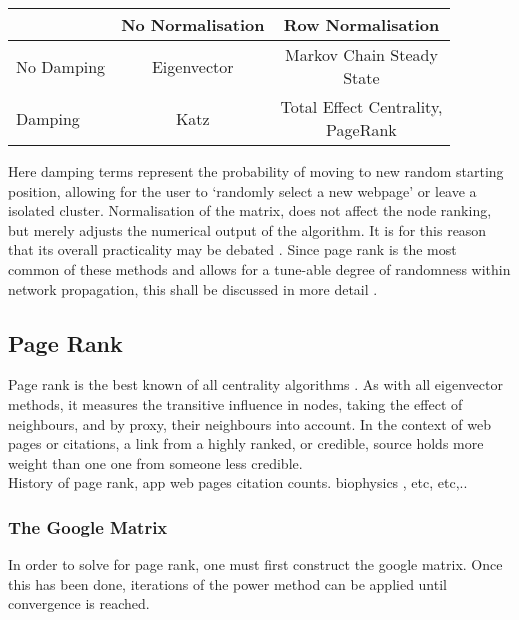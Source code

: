 \documentclass[twoside,reqno]{article}
\begin{document}
\begin{table}[H]
\begin{tabular}{l||cc}
\hline
 &No Normalisation  & Row Normalisation \\
 \hline \hline

No Damping &
 \shortstack{Eigenvector \cite{eigen,eigen2} \\ \:}
 & \shortstack{ Markov Chain Steady \\ State \cite{seeley} \\ \:} \\

Damping &
 \shortstack{Katz \cite{katz}\\ \:}
 & \shortstack{Total Effect Centrality, \\ PageRank \cite{google}} \\
 \hline
\end{tabular}
\end{table}


Here damping terms represent the probability of moving to new random starting position, allowing for the user to `randomly select a new webpage' or leave a isolated cluster. Normalisation of the matrix, does not affect the node ranking, but merely adjusts the numerical output of the algorithm. It is for this reason that its overall practicality may be debated \cite{spectral}. Since page rank is the most common of these methods and allows for a tune-able degree of randomness within network propagation, this shall be discussed in more detail .


\subsection{Page Rank}


Page rank is the best known of all centrality algorithms \cite{neoj4}. As with all eigenvector methods, it measures the transitive influence in nodes, taking the effect of neighbours, and by proxy, their neighbours into account. In the context of web pages or citations, a link from a highly ranked, or credible, source holds more weight than one one from someone less credible. \\


History of page rank, app web pages citation counts. biophysics , etc, etc,..

\subsubsection{The Google Matrix}
In order to solve for page rank, one must first construct the google matrix. Once this has been done, iterations of the power method can be applied until convergence is reached. \\
\end{document}
